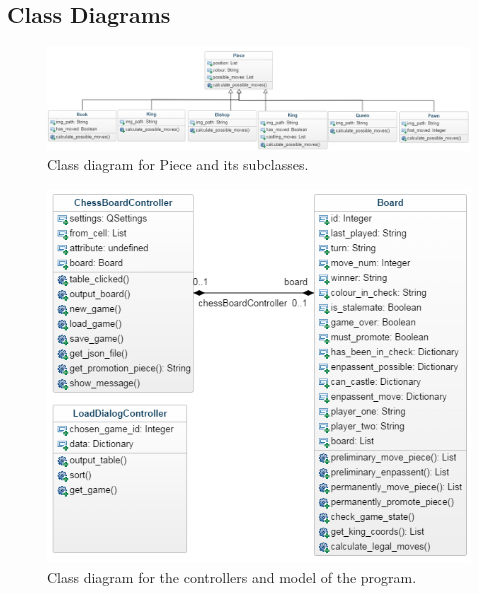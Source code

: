 \subsection{Class Diagrams}
\begin{figure}[H]
\centering
	\includegraphics[width=1.0\textwidth]{images/class-diagrams/pieces}
	\caption{Class diagram for Piece and its subclasses.}
\end{figure}
\begin{figure}[H]
\centering
	\includegraphics[width=1.0\textwidth]{images/class-diagrams/board}
	\caption{Class diagram for the controllers and model of the program.}
\end{figure}
